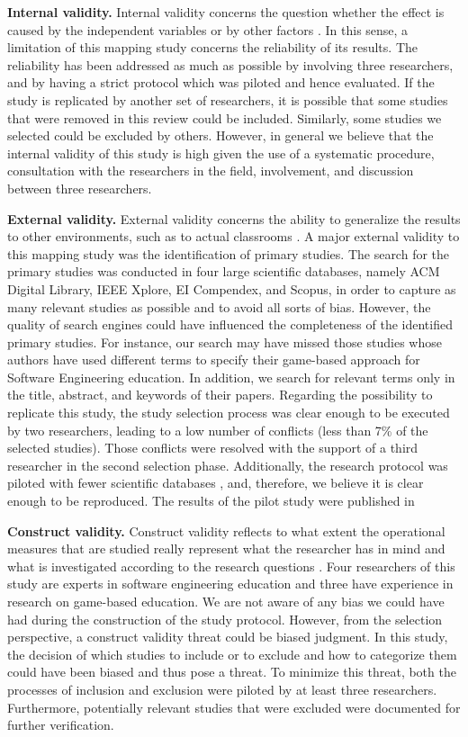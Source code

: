 \textbf{Internal validity.} Internal validity concerns the question whether the effect is caused by the independent variables or by other factors \citep{Wohlin:2012}. In this sense, a limitation of this mapping study concerns the reliability of its results. The reliability has been addressed as much as possible by involving three researchers, and by having a strict protocol which was piloted and hence evaluated. If the study is replicated by another set of researchers, it is possible that some studies that were removed in this review could be included. Similarly, some studies we selected could be excluded by others. However, in general we believe that the internal validity of this study is high given the use of a systematic procedure, consultation with the researchers in the field, involvement, and discussion between three researchers.

\textbf{External validity.} External validity concerns the ability to generalize the results to other environments, such as to actual classrooms \citep{Wohlin:2012}. A major external validity to this mapping study was the identification of primary studies. The search for the primary studies was conducted in four large scientific databases, namely ACM Digital Library, IEEE Xplore, EI Compendex, and Scopus, in order to capture as many relevant studies as possible and to avoid all sorts of bias. However, the quality of search engines could have influenced the completeness of the identified primary studies. For instance, our search may have missed those studies whose authors have used different terms to specify their game-based approach for Software Engineering education. In addition, we search for relevant terms only in the title, abstract, and keywords of their papers. Regarding the possibility to replicate this study, the study selection process was clear enough to be executed by two researchers, leading to a low number of conflicts (less than 7\% of the selected studies). Those conflicts were resolved with the support of a third researcher in the second selection phase. Additionally, the research protocol was piloted with fewer scientific databases , and, therefore, we believe it is clear enough to be reproduced. The results of the pilot study were published in \cite{Souza:2017b}

\textbf{Construct validity.} Construct validity reflects to what extent the operational measures that are studied really represent what the researcher has in mind and what is investigated according to the research questions \citep{Wohlin:2012}. Four researchers of this study are experts in software engineering education and three have experience in research on game-based education. We are not aware of any bias we could have had during the construction of the study protocol. However, from the selection perspective, a construct validity threat could be biased judgment. In this study, the decision of which studies to include or to exclude and how to categorize them could have been biased and thus pose a threat. To minimize this threat, both the processes of inclusion and exclusion were piloted by at least three researchers. Furthermore, potentially relevant studies that were excluded were documented for further verification. 

